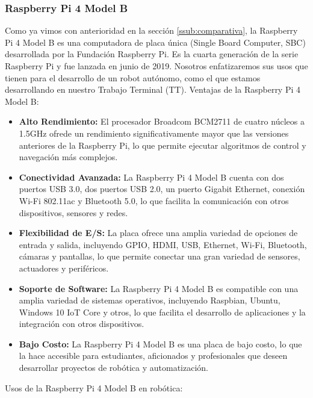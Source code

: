 \subsubsection{Raspberry Pi 4 Model B} %
\label{subsubsection:rasp4}
    Como ya vimos con anterioridad en la secci\'on \ref{ssub:comparativa}, la Raspberry Pi 4 Model B es una computadora de placa \'unica 
    (Single Board Computer, SBC) desarrollada por la Fundaci\'on Raspberry Pi. Es la cuarta generaci\'on de la serie Raspberry Pi y fue lanzada en 
        junio de 2019. Nosotros enfatizaremos sus usos que tienen para el desarrollo de un robot aut\'onomo, como el que estamos
        desarrollando en nuestro Trabajo Terminal (TT).
    \vskip 0.5cm
    Ventajas de la Raspberry Pi 4 Model B:
    \begin{itemize}
        \item \textbf{Alto Rendimiento:} El procesador Broadcom BCM2711 de cuatro n\'ucleos a 1.5GHz ofrede un rendimiento 
            significativamente mayor que las versiones anteriores de la Raspberry Pi, lo que permite ejecutar algoritmos 
            de control y navegaci\'on m\'as complejos.
        \item \textbf{Conectividad Avanzada:} La Raspberry Pi 4 Model B cuenta con dos puertos USB 3.0, dos puertos USB 2.0, 
            un puerto Gigabit Ethernet, conexi\'on Wi-Fi 802.11ac y Bluetooth 5.0, lo que facilita la comunicaci\'on con otros
            dispositivos, sensores y redes.
        \item \textbf{Flexibilidad de E/S:} La placa ofrece una amplia variedad de opciones de entrada y salida, incluyendo
            GPIO, HDMI, USB, Ethernet, Wi-Fi, Bluetooth, c\'amaras y pantallas, lo que permite conectar una gran variedad de
            sensores, actuadores y perif\'ericos.
        \item \textbf{Soporte de Software:} La Raspberry Pi 4 Model B es compatible con una amplia variedad de sistemas
            operativos, incluyendo Raspbian, Ubuntu, Windows 10 IoT Core y otros, lo que facilita el desarrollo de aplicaciones
            y la integraci\'on con otros dispositivos.
        \item \textbf{Bajo Costo:} La Raspberry Pi 4 Model B es una placa de bajo costo, lo que la hace accesible para
            estudiantes, aficionados y profesionales que deseen desarrollar proyectos de rob\'otica y automatizaci\'on.
    \end{itemize}
    \vskip 0.5cm
    Usos de la Raspberry Pi 4 Model B en rob\'otica:
